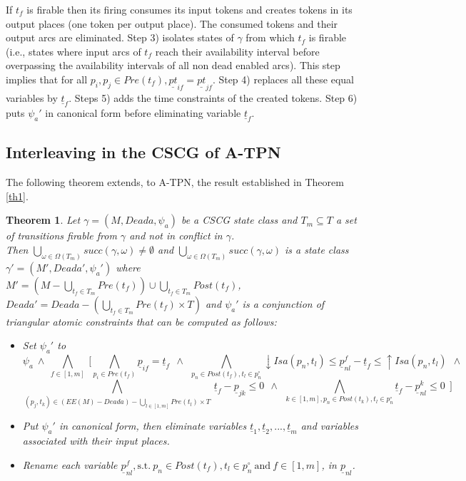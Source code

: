 \documentclass[submission,copyright,creativecommons]{eptcs}
\newtheorem{theorem}{Theorem}
\numberwithin{equation}{section}
\begin{document}
\noindent If $t_f$ is firable then its firing consumes its input tokens and creates tokens in its output places (one token per output place). The consumed tokens and their output arcs are eliminated. Step 3) isolates states of $\gamma$ from which $t_f$ is firable (i.e., states where input arcs of $t_f$ reach their availability interval before overpassing the availability intervals of all non dead enabled arcs). This step implies that for all $p_i, p_j \in Pre(t_f), \underline{pt}_{if}=\underline{pt}_{jf}$. Step 4) replaces all these equal variables by $\underline{t}_f$.  Steps 5) adds the time constraints of the created tokens. Step 6) puts $\psi_a'$ in canonical form before eliminating variable $\underline{t}_f$.
\subsection{Interleaving in the CSCG of A-TPN}
The following theorem extends, to A-TPN, the result established in Theorem \ref{th1}.


\begin{theorem} \label{th2}
Let $\gamma=(M,Deada,\psi_a)$ be a CSCG state class and $T_m \subseteq T$ a set of transitions firable from $\gamma$ and not in conflict in $\gamma$.\\ Then $\underset{\omega \in \Omega(T_m)} \bigcup succ(\gamma, \omega) \neq \emptyset$ and $\underset{\omega \in \Omega(T_m)} \bigcup succ(\gamma, \omega)$ is a state class $\gamma' = (M',Deada', \psi_a')$ where $M' = (M - \underset{t_f \in T_m} \bigcup Pre(t_f)) \cup \underset{t_f \in T_m} \bigcup Post(t_f)$, $Deada'=Deada- (\underset{t_f \in T_m} \bigcup Pre(t_f) \times T) $ and $\psi_a'$ is a conjunction of triangular atomic constraints that can be computed as follows:
\begin{itemize}
\item Set $\psi_a'$ to $$\psi_a \ \wedge \  \underset{f \in [1,m]} \bigwedge \ [ \underset{p_i \in Pre(t_{f})} \bigwedge  \underline{p}_{if} = \underline{t}_f \ \ \wedge \ \ \underset{p_n \in Post(t_{f}), t_l \in p_n^\circ } \bigwedge {\downarrow Isa(p_{n},t_l)} \leq \underline{p}_{nl}^f - \underline{t}_{f} \leq
{\uparrow Isa(p_{n}, t_l)} \ \ \wedge \ $$
$$ \underset{(p_j,t_k) \in (EE(M)-Deada) - \underset{l \in [1,m]} \bigcup Pre(t_{l}) \times T} \bigwedge   \  \underline{t}_{f} - \underline{p}_{jk} \leq 0  \ \  \wedge \ \  \underset{ k \in[1,m], p_n \in Post(t_{k}), t_l \in p_n^\circ } \bigwedge \underline{t}_{f} - \underline{p}_{nl}^k \leq 0 \ \ ]$$
\item Put $\psi_a'$ in canonical form, then eliminate variables $\underline{t}_1, \underline{t}_2, ..., \underline{t}_m$ and variables associated with their input places. \item Rename each variable $\underline{p}_{nl}^f, \text{s.t.} \ p_n \in Post(t_f), t_l \in p_n^\circ  \ \text{and} \ f \in [1,m]$, in  $\underline{p}_{nl}$.
\end{itemize}
\end{theorem}
\end{document}
